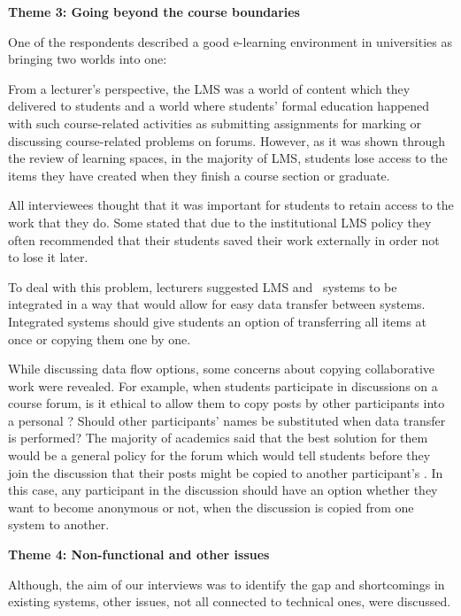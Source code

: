 \textbf{Theme 3: Going beyond the course boundaries}

One of the respondents described a good e-learning environment in universities
as bringing two worlds into one:


From a lecturer's perspective, the LMS was a world of content which they
delivered to students and a world where students' formal education happened with
such course-related activities as submitting assignments for marking or discussing
course-related problems on forums. However, as it was shown through the review
of learning spaces, in the majority of LMS, students lose access to the items
they have created when they finish a course section or graduate.

All interviewees thought that it was important for students to retain access to
the work that they do. Some stated that due to the institutional LMS policy they
often recommended that their students saved their work externally in order not
to lose it later.

To deal with this problem, lecturers suggested LMS and \ep~systems to be
integrated in a way that would allow for easy data transfer between systems.
Integrated systems should give students an option of transferring all items at
once or copying them one by one.

While discussing data flow options, some concerns about copying collaborative
work were revealed. For example, when students participate in discussions on a
course forum, is it ethical to allow them to copy posts by other participants
into a personal \ep? Should other participants' names be substituted when
data transfer is performed? The majority of academics said that the best
solution for them would be a general policy for the forum which would tell
students before they join the discussion that their posts might be copied to
another participant's \ep. In this case, any participant in the discussion
should have an option whether they want to become anonymous or not, when the
discussion is copied from one system to another.

\textbf{Theme 4: Non-functional and other issues}

Although, the aim of our interviews was to identify the gap and shortcomings in
existing systems, other issues, not all connected to technical ones, were
discussed.

